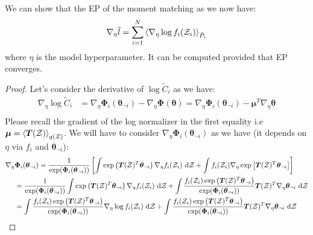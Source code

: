 \begin{proposition}
    We can show that the EP of the moment matching as we now have:
    \begin{equation*}
        \nabla_\eta \tilde{l} = \sum^N_{i=1}\left\langle \nabla_\eta \log f_i(\mathcal{Z}_i) \right\rangle_{\hat{P}_i}
    \end{equation*}
    where $\eta$ is the model hyperparameter. It can be computed provided that EP converges.
\end{proposition}
\begin{proof}
    Let's consider the derivative of $\log \tilde{C}_i$ as we have:
    \begin{equation*}
    \begin{aligned}
        \nabla_\eta \log \tilde{C}_i &= \nabla_\eta \boldsymbol \Phi_i(\boldsymbol \theta_{\neg i}) - \nabla_\eta \boldsymbol \Phi(\boldsymbol \theta) = \nabla_\eta \boldsymbol \Phi_i(\boldsymbol \theta_{\neg i}) - \boldsymbol\mu^T\nabla_\eta\boldsymbol\theta \\
    \end{aligned}
    \end{equation*}
    Please recall the gradient of the log normalizer in the first equality i.e $\boldsymbol\mu = \left\langle \boldsymbol T(\mathcal{Z}) \right\rangle_{q(\mathcal{Z})}$. We will have to consider $\nabla_\eta \boldsymbol \Phi_i(\boldsymbol \theta_{\neg i})$ as we have (it depends on $\eta$ via $f_i$ and $\boldsymbol\theta_{\neg i}$):
    \begin{equation*}
    \begin{aligned}
        \nabla_\eta &\boldsymbol \Phi_i(\boldsymbol \theta_{\neg i}) = \frac{1}{\exp(\boldsymbol \Phi_i(\boldsymbol \theta_{\neg i}))}\brackb{ \int \exp\bracka{\boldsymbol T(\mathcal{Z})^T\boldsymbol \theta_{\neg i}}\nabla_\eta f_i(\mathcal{Z}_i) \dby\mathcal{Z} + \int f_i(\mathcal{Z}_i)\nabla_\eta \exp\brackb{\boldsymbol T(\mathcal{Z})^T\boldsymbol \theta_{\neg i}} } \\
        &= \frac{1}{\exp(\boldsymbol \Phi_i(\boldsymbol \theta_{\neg i}))}\int \exp\bracka{\boldsymbol T(\mathcal{Z})^T\boldsymbol \theta_{\neg i}}\nabla_\eta f_i(\mathcal{Z}_i) \dby\mathcal{Z} +  \int \frac{f_i(\mathcal{Z}_i) \exp\bracka{\boldsymbol T(\mathcal{Z})^T\boldsymbol \theta_{\neg i}}}{\exp(\boldsymbol \Phi_i(\boldsymbol \theta_{\neg i}))} \boldsymbol T(\mathcal{Z})^T\nabla_\eta \boldsymbol \theta_{\neg i} \dby\mathcal{Z} \\
        &= \int \frac{f_i(\mathcal{Z}_i)\exp\bracka{\boldsymbol T(\mathcal{Z})^T\boldsymbol \theta_{\neg i}}}{\exp(\boldsymbol \Phi_i(\boldsymbol \theta_{\neg i}))}\nabla_\eta \log f_i(\mathcal{Z}_i) \dby\mathcal{Z} +  \int \frac{f_i(\mathcal{Z}_i) \exp\bracka{\boldsymbol T(\mathcal{Z})^T\boldsymbol \theta_{\neg i}}}{\exp(\boldsymbol \Phi_i(\boldsymbol \theta_{\neg i}))} \boldsymbol T(\mathcal{Z})^T\nabla_\eta \boldsymbol \theta_{\neg i} \dby\mathcal{Z} \\

\end{aligned}
\end{equation*}
\end{proof}
